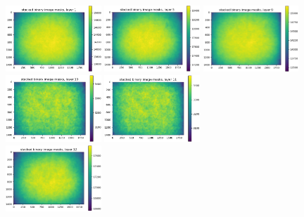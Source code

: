 \documentclass[letterpaper,11pt]{article}
\begin{document}
\begin{figure}[!hb]
\centering
\includegraphics[width=0.32\textwidth]{images/measuring_flatfield_corrections/mask_stack_layers_polaris/mask_stack_layer_1}
\includegraphics[width=0.32\textwidth]{images/measuring_flatfield_corrections/mask_stack_layers_polaris/mask_stack_layer_5}
\includegraphics[width=0.32\textwidth]{images/measuring_flatfield_corrections/mask_stack_layers_polaris/mask_stack_layer_9}
\includegraphics[width=0.32\textwidth]{images/measuring_flatfield_corrections/mask_stack_layers_polaris/mask_stack_layer_10}
\includegraphics[width=0.32\textwidth]{images/measuring_flatfield_corrections/mask_stack_layers_polaris/mask_stack_layer_11} \\
\includegraphics[width=0.32\textwidth]{images/measuring_flatfield_corrections/mask_stack_layers_polaris/mask_stack_layer_12}

\end{figure}
\end{document}
